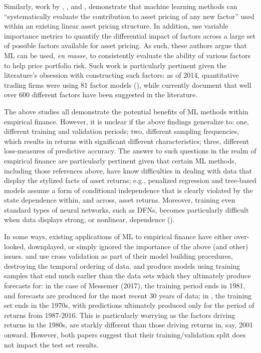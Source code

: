 \documentclass{article}
\begin{document}
Similarly, work by \cite{kozak_shrinking_2017}, \cite{freyberger_dissecting_2017}, \cite{feng_taming_2019} and \cite{rapach_forecasting_2013}, demonstrate that machine learning methods can ``systematically evaluate the contribution to asset pricing of any new factor'' used within an existing linear asset pricing structure. In addition, \cite{gu_empirical_2018} use variable importance metrics to quantify the differential impact of factors across a large set of possible factors available for asset pricing. As such, these authors argue that ML can be used, \textit{en masse}, to consistently evaluate the ability of various factors to help price portfolio risk. Such work is particularly pertinent given the literature's obsession with constructing such factors: as of 2014, quantitative trading firms were using 81 factor models (\cite{hsu_finding_2014}), while \cite{harvey_census_2019} currently document that well over 600 different factors have been suggested in the literature. 

The above studies all demonstrate the potential benefits of ML methods within empirical finance. However, it is unclear if the above findings generalize to: one, different training and validation periods; two, different sampling frequencies, which results in returns with significant different characteristics;  three, different loss-measures of predictive accuracy. The answer to such questions in the realm of empirical finance are particularly pertinent given that certain ML methods, including those references above, have know difficulties in dealing with data that display the stylized facts of asset returns; e.g., penalized regression and tree-based models assume a form of conditional independence that is clearly violated by the state dependence within, and across, asset returns. Moreover, training even standard types of neural networks, such as DFNs, becomes particularly difficult when data displays strong, or nonlinear, dependence (\cite{bengio_learning_1994}). 


In some ways, existing applications of ML to empirical finance have either over-looked, downplayed, or simply ignored the importance of the above (and other) issues. \cite{messmer2017deep} and \cite{feng_deep_2018} use cross validation as part of their model building procedures, destroying the temporal ordering of data. \cite{gu_empirical_2018} and \cite{messmer2017deep} produce models using training samples that end much earlier than the data sets which they ultimately produce forecasts for: in the case of Messemer (2017), the training period ends in 1981, and forecasts are produced for the most recent 30 years of data; in  \cite{gu_empirical_2018}, the training set ends in the 1970s, with predictions ultimately produced only for the period of returns from 1987-2016.  This is particularly worrying as the factors driving returns in the 1980s, are starkly different than those driving returns in, say, 2001 onward. However, both papers suggest that their training/validation split does not impact the test set results. 
\end{document}
